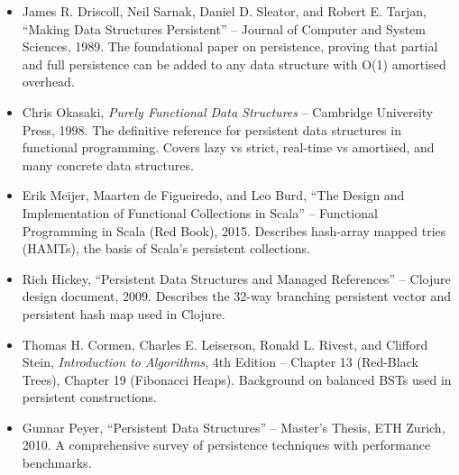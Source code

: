 \begin{itemize}
\item James R. Driscoll, Neil Sarnak, Daniel D. Sleator, and Robert E. Tarjan, ``Making Data Structures Persistent'' -- Journal of Computer and System Sciences, 1989. The foundational paper on persistence, proving that partial and full persistence can be added to any data structure with O(1) amortised overhead.

\item Chris Okasaki, \textit{Purely Functional Data Structures} -- Cambridge University Press, 1998. The definitive reference for persistent data structures in functional programming. Covers lazy vs strict, real-time vs amortised, and many concrete data structures.

\item Erik Meijer, Maarten de Figueiredo, and Leo Burd, ``The Design and Implementation of Functional Collections in Scala'' -- Functional Programming in Scala (Red Book), 2015. Describes hash-array mapped tries (HAMTs), the basis of Scala's persistent collections.

\item Rich Hickey, ``Persistent Data Structures and Managed References'' -- Clojure design document, 2009. Describes the 32-way branching persistent vector and persistent hash map used in Clojure.

\item Thomas H. Cormen, Charles E. Leiserson, Ronald L. Rivest, and Clifford Stein, \textit{Introduction to Algorithms}, 4th Edition -- Chapter 13 (Red-Black Trees), Chapter 19 (Fibonacci Heaps). Background on balanced BSTs used in persistent constructions.

\item Gunnar Peyer, ``Persistent Data Structures'' -- Master's Thesis, ETH Zurich, 2010. A comprehensive survey of persistence techniques with performance benchmarks.
\end{itemize}
